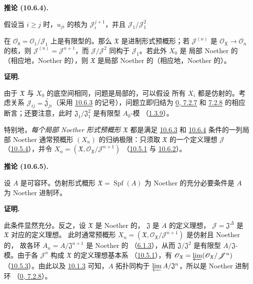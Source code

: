 \documentclass[UTF8,fontset=none,11pt,oneside,openany]{ctexbook}
\newenvironment{corollary}[1][]{%
  \par\medskip\noindent\textbf{推论 (#1).}\ %
}{\par}
\newenvironment{proof}{%
  \par\medskip\noindent\textbf{证明.}\ %
}{\par}
\newcommand{\oldpage}[2][]{%
  \hypertarget{ega-source-page-#1-#2}{}%
  \marginnote{\scriptsize\textbf{#1}~|~#2}\ignorespaces}
\let\EGAOriginalLabel\label
\renewcommand{\label}[1]{\phantomsection\EGAOriginalLabel{#1}}
\begin{document}
\begin{corollary}[10.6.4]
\label{I.10.6.4-fr}
假设当 $i\geq j$ 时，$u_{ji}$ 的核为 $\mathscr{J}_i^{j+1}$，并且
$\mathscr{J}_1/\mathscr{J}_1^2$

\oldpage[I]{191}

在 $\mathscr{O}_0=\mathscr{O}_1/\mathscr{J}_1$ 上是有限型的。那么
$\mathfrak{X}$ 是进制形式预概形；若 $\mathscr{J}^{(n)}$ 是
$\mathscr{O}_{\mathfrak{X}}\to\mathscr{O}_n$ 的核，则
$\mathscr{J}^{(n)}=\mathscr{J}^{n+1}$，而
$\mathscr{J}/\mathscr{J}^2$ 同构于 $\mathscr{J}_1$。若此外 $X_0$ 是
局部 Noether 的（相应地，Noether 的），则 $\mathfrak{X}$ 是局部
Noether 的（相应地，Noether 的）。
\end{corollary}

\begin{proof}
由于 $\mathfrak{X}$ 与 $X_0$ 的底空间相同，问题是局部的，可以假设
所有 $X_i$ 都是仿射的。考虑关系
$\mathscr{J}_{ij}=\widetilde{\mathfrak{J}_{ji}}$（采用
\hyperref[I.10.6.3-fr]{10.6.3} 的记号），问题立即归结为
\hyperref[0.7.2.7-fr]{0, 7.2.7} 和
\hyperref[0.7.2.8-fr]{7.2.8} 的相应断言；还要注意，此时
$\mathfrak{J}_1/\mathfrak{J}_1^2$ 是有限型 $A_0$-模
（\hyperref[I.1.3.9-fr]{1.3.9}）。
\end{proof}

特别地，\emph{每个局部 Noether 形式预概形 $\mathfrak{X}$} 都是满足
\hyperref[I.10.6.3-fr]{10.6.3} 和
\hyperref[I.10.6.4-fr]{10.6.4} 条件的一列局部 Noether 通常预概形
$(X_n)$ 的归纳极限：只须取 $\mathfrak{X}$ 的一个定义理想
$\mathscr{J}$（\hyperref[I.10.5.4-fr]{10.5.4}），并令
$X_n=(\mathfrak{X},
\mathscr{O}_{\mathfrak{X}}/\mathscr{J}^{n+1})$
（\hyperref[I.10.5.1-fr]{10.5.1} 与
\hyperref[I.10.6.2-fr]{10.6.2}）。

\begin{corollary}[10.6.5]
\label{I.10.6.5-fr}
设 $A$ 是可容环。仿射形式概形
$\mathfrak{X}=\operatorname{Spf}(A)$ 为 Noether 的充分必要条件是 $A$
为 Noether 进制环。
\end{corollary}

\begin{proof}
此条件显然充分。反之，设 $\mathfrak{X}$ 是 Noether 的，
$\mathfrak{J}$ 是 $A$ 的定义理想，
$\mathscr{J}=\mathfrak{J}^\Delta$ 是 $\mathfrak{X}$ 对应的定义理想。
此时通常预概形
$X_n=(\mathfrak{X},
\mathscr{O}_{\mathfrak{X}}/\mathscr{J}^{n+1})$ 是仿射且 Noether 的，
故各环 $A_n=A/\mathfrak{J}^{n+1}$ 是 Noether 的
（\hyperref[I.6.1.3-fr]{6.1.3}），从而
$\mathfrak{J}/\mathfrak{J}^2$ 是有限型 $A/\mathfrak{J}$-模。由于各
$\mathscr{J}^n$ 构成 $\mathfrak{X}$ 的定义理想基本系
（\hyperref[I.10.5.1-fr]{10.5.1}），有
$\mathscr{O}_{\mathfrak{X}}
=\varprojlim(\mathscr{O}_{\mathfrak{X}}/\mathscr{J}^n)$
（\hyperref[I.10.5.3-fr]{10.5.3}）。由此以及
\hyperref[I.10.1.3-fr]{10.1.3} 可知，$A$ 拓扑同构于
$\varprojlim A/\mathfrak{J}^n$，所以是 Noether 进制环
（\hyperref[0.7.2.8-fr]{0, 7.2.8}）。
\end{proof}
\end{document}
